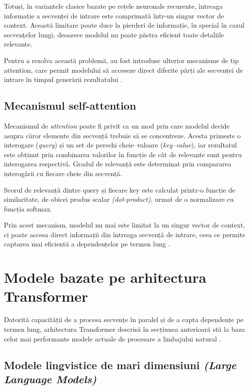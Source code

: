 \documentclass[12pt, a4paper, oneside, romanian]{teza-upb}
\begin{document}
Totuși, în variantele clasice bazate pe rețele neuronale recurente, întreaga informație a secvenței de intrare este comprimată într-un singur vector de context. Această limitare poate duce la pierderi de informație, în special în cazul secvențelor lungi, deoarece modelul nu poate păstra eficient toate detaliile relevante.

Pentru a rezolva această problemă, au fost introduse ulterior mecanisme de tip attention, care permit modelului să acceseze direct diferite părți ale secvenței de intrare în timpul generării rezultatului \cite{bahdanau2015neural}.


\subsection{Mecanismul self-attention}
    
Mecanismul de \textit{attention} poate fi privit ca un mod prin care
modelul decide asupra căror elemente din secvență trebuie să se
concentreze. Acesta primește o interogare (\textit{query}) și un set
de perechi cheie–valoare (\textit{key–value}), iar rezultatul este
obținut prin combinarea valorilor în funcție de cât de relevante sunt
pentru interogarea respectivă. Gradul de relevanță este determinat
prin compararea interogării cu fiecare cheie din secvență. 

Scorul de relevanță dintre query și fiecare key este calculat printr-o funcție de similaritate, de obicei produs scalar \textit{(dot-product)}, urmat de o normalizare cu funcția softmax.

Prin acest mecanism, modelul nu mai este limitat la un singur vector de context, ci poate accesa direct informații din întreaga secvență de intrare, ceea ce permite captarea mai eficientă a dependențelor pe termen lung \cite{vaswani2017attention}.
    
\section{Modele bazate pe arhitectura Transformer}

Datorită capacității de a procesa secvențe în paralel și de a capta dependențe pe termen lung, arhitectura Transformer descrisă în secțiunea anterioară stă la baza celor mai performante modele actuale de procesare a limbajului natural \cite{datacamp}.

    \subsection{Modele lingvistice de mari dimensiuni \textit{(Large Language Models)}}
\end{document}
